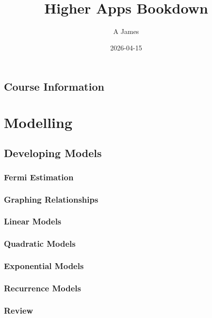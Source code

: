 \documentclass[
  11pt,
  openany]{book}
\title{Higher Apps Bookdown}
\author{A James}
\date{2026-04-15}
\begin{document}
\maketitle

{
\setcounter{tocdepth}{1}
\tableofcontents
}
\chapter*{Course Information}\label{course-information}

\part{Modelling}\label{part-modelling}

\chapter{Developing Models}\label{developing-models}

\section{Fermi Estimation}\label{fermi-estimation}

\section{Graphing Relationships}\label{graphing-relationships}

\section{Linear Models}\label{linear-models}

\section{Quadratic Models}\label{quadratic-models}

\section{Exponential Models}\label{exponential-models}

\section{Recurrence Models}\label{recurrence-models}

\section*{Review}\label{review}
\end{document}

